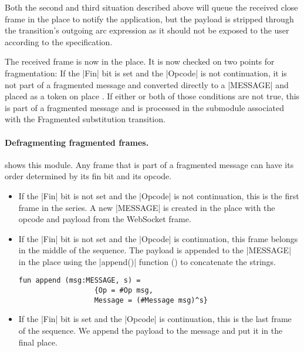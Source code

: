 		Both the second and third situation described above will queue the received
		close frame in the  place to notify the application, but the payload is
		stripped through the  transition's outgoing arc
		expression as it should not be exposed to the user according to the
		specification.
		
		The received frame is now in the  place. It is now checked
		on two points for fragmentation:
		If the |Fin| bit is set and the |Opcode| is not continuation, it is not part of
		a fragmented message and converted directly to a |MESSAGE| and placed as a
		token on place .
		If either or both of those conditions are not true, this is part of a fragmented message and is processed
		in the  submodule associated with the Fragmented
		substitution transition.
		
		\paragraph{Defragmenting fragmented frames.}
			
			 shows this module. Any frame that is part of a fragmented
			message can have its order determined by its fin bit and its opcode.
			
			
			\begin{itemize}
				\item If the |Fin| bit is not set and the |Opcode| is not continuation, this is the
				first frame in the series. A new |MESSAGE| is created in the
				 place with the opcode and payload from the WebSocket frame.
				
				\item If the |Fin| bit is not set and the |Opcode| is continuation, this
				frame belongs in the middle of the sequence. The payload is appended to the
				|MESSAGE| in the  place using the |append()|
				function () to concatenate the strings.
				
				\begin{lstlisting}[label=lst:append,caption=append,gobble=3,float=h]
				fun append (msg:MESSAGE, s) = 
				  {Op = #Op msg,
				  Message = (#Message msg)^s}
				\end{lstlisting}
				
				\item If the |Fin| bit is set and the |Opcode| is continuation, this is the
				last frame of the sequence. We append the payload to the message and put it in the final
				 place. 
			\end{itemize}
			
